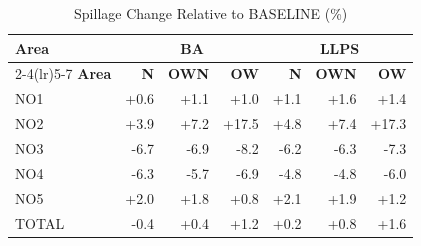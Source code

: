 \begin{table}[htbp]
\centering
\caption{Spillage Change Relative to BASELINE (\%)}
\label{tab:spillage_pct_baseline}
\small
\begin{tabular}{lrrrrrr}
\toprule
\textbf{Area} & \multicolumn{3}{c}{\textbf{BA}} & \multicolumn{3}{c}{\textbf{LLPS}} \\
\cmidrule(lr){2-4}\cmidrule(lr){5-7}
\textbf{Area} & \textbf{N} & \textbf{OWN} & \textbf{OW} & \textbf{N} & \textbf{OWN} & \textbf{OW} \\
\midrule
NO1 & +0.6 & +1.1 & +1.0 & +1.1 & +1.6 & +1.4 \\
NO2 & +3.9 & +7.2 & +17.5 & +4.8 & +7.4 & +17.3 \\
NO3 & -6.7 & -6.9 & -8.2 & -6.2 & -6.3 & -7.3 \\
NO4 & -6.3 & -5.7 & -6.9 & -4.8 & -4.8 & -6.0 \\
NO5 & +2.0 & +1.8 & +0.8 & +2.1 & +1.9 & +1.2 \\
TOTAL & -0.4 & +0.4 & +1.2 & +0.2 & +0.8 & +1.6 \\
\bottomrule
\end{tabular}
\end{table}
